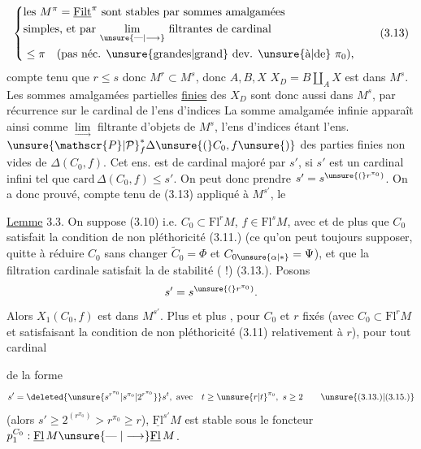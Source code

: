 \[
\left\{\begin{aligned}
&\text{les }M^\pi=\underline{\mathrm{Filt}}^\pi\text{ sont stables par sommes amalgamées}\\
&\text{simples, et par }\underset{\unsure{\mathrel{\text{---}}|\longrightarrow}}{\lim}\text{ filtrantes de cardinal}\\
&\le\pi\quad\text{(pas néc. \unsure{grandes|grand} dev. \unsure{à|de} }\pi_0),
\end{aligned}\right.
\tag*{(3.13)}
\]
compte tenu que $r\le s$ donc $M^r\subset M^s$, donc $A,B,X$  $X_D=B\amalg_A X$ est dans $M^s$. Les sommes amalgamées partielles \uline{finies} des $X_D$ sont donc aussi dans $M^s$, par récurrence sur le cardinal de l'ens d'indices\unsure{;|,}  La somme amalgamée infinie apparaît ainsi comme $\underset{\longrightarrow}{\lim}$ filtrante d'objets de $M^s$, l'ens d'indices étant l'ens. $\unsure{\mathscr{P}|\mathcal{P}}^*_f\Delta\unsure{(}C_0,f\unsure{)}$ des parties finies non vides de $\Delta(C_0,f)$. Cet ens. est de cardinal majoré par  $s'$,   si $s'$ est un cardinal infini tel que $\mathrm{card}\,\Delta(C_0,f)\le s'$. On peut donc prendre $s'=s^{\unsure{(}r^{\pi_0})}$.
On a donc prouvé, compte tenu de (3.13) appliqué à $M^{s'}$, le

\uline{Lemme} 3.3. On suppose (3.10) i.e. $C_0\subset\mathrm{Fl}^rM$, $f\in\mathrm{Fl}^sM$, avec   et de plus que $C_0$ satisfait la condition de non pléthoricité (3.11.) (ce qu'on peut toujours supposer, quitte à réduire $C_0$ sans changer $\widetilde{C}_0=\Phi$ et $C_{0\unsure{\alpha|*}}=\Psi$), et que la filtration cardinale satisfait la  de stabilité ( !) (3.13.). Posons
\[
s'=s^{\unsure{(}r^{\pi_0})}.
\]
Alors $X_1(C_0,f)$ est dans $M^{s'}$. Plus  et plus , pour $C_0$ et $r$ fixés (avec $C_0\subset\mathrm{Fl}^rM$ et satisfaisant la condition de non pléthoricité (3.11) relativement à $r$), pour tout cardinal

de la forme
\[
s'=\deleted{\unsure{s^{r^{\pi_0}}|s^{\pi_0}|2^{r^{\pi_0}}}}s^t,\ \text{avec}\quad t\ge\unsure{r|t}^{\pi_0},\ s\ge2
\tag*{\unsure{(3.13.)|(3.15.)}}
\]
(alors $s'\ge2^{(r^{\pi_0})}>r^{\pi_0}\ge r$), $\underline{\mathrm{Fl}}^{s'}M$ est stable sous le foncteur $p_1^{C_0}:\underline{\mathrm{Fl}}\,M\unsure{\mathrel{\text{---}}|\longrightarrow}\underline{\mathrm{Fl}}\,M$.

